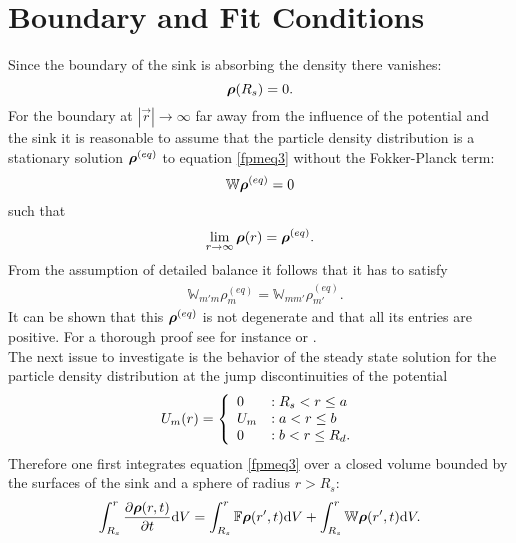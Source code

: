 \section{Boundary and Fit Conditions}
\label{Fit_Conditions}
Since the boundary of the sink is absorbing the density there vanishes:
\begin{equation}
    \boldsymbol{\mathbf{\rho}}(R_s) = 0.
    \label{bcrs}
\end{equation}
For the boundary at $|\vec{r}| \rightarrow \infty$ far away from the influence of the potential and the sink it is reasonable to assume that the particle density distribution is a stationary solution $\boldsymbol{\mathbf{\rho}}^{(eq)}$ to equation \eqref{fpmeq3} without the Fokker-Planck term:
\begin{equation}
    \mathbb{W} \boldsymbol{\mathbf{\rho}}^{(eq)} = 0 \nonumber
\end{equation}
such that
\begin{equation}
    \lim_{r \rightarrow \infty}\boldsymbol{\mathbf{\rho}}(r) = \boldsymbol{\mathbf{\rho}}^{(eq)}.
    \label{bcinf}
\end{equation}
From the assumption of detailed balance it follows that it has to satisfy
\begin{align}
    &\mathbb{W}_{m'm} \rho_m^{(eq)} = \mathbb{W}_{mm'}\rho_{m'}^{(eq)}.
    \label{detailed_balance2}
\end{align}
It can be shown that this $\boldsymbol{\mathbf{\rho}}^{(eq)}$ is not degenerate and that all its entries are positive. For a thorough proof see for instance \cite{VanKampen1992} or \cite{Oppenheim1977}. \\
The next issue to investigate is the behavior of the steady state solution for the particle density distribution at the jump discontinuities of the potential 
\begin{equation}
  U_m(r) = \left\{ \begin{array}{l l} 
        0 &: R_s < r \le a \\
        U_m &: a<r \le b \\
        0 &: b < r \le R_d.
    \end{array} \right.
    \label{step_potential}
\end{equation}
Therefore one first integrates equation \eqref{fpmeq3} over a closed volume bounded by the surfaces of the sink and a sphere of radius $r>R_s$:
\begin{equation*}
    \int_{R_s}^{r} \frac{\partial \boldsymbol{\mathbf{\rho}}(r,t)}{\partial t}{\rm d}V =  \int_{R_s}^{r}\mathbb{F}\boldsymbol{\mathbf{\rho}}(r',t){\rm d} V + \int_{R_s}^{r} \mathbb{W}\boldsymbol{\mathbf{\rho}}(r',t) {\rm d} V .
\end{equation*}
